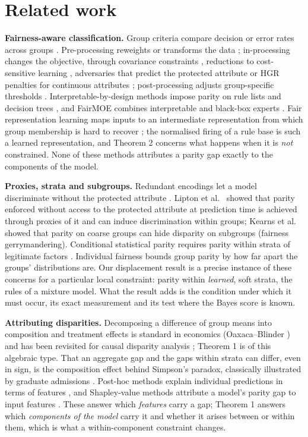 \hypertarget{related-work}{%
\section{Related work}\label{related-work}}

\textbf{Fairness-aware classification.} Group criteria compare decision or error rates across groups \cite{mehrabi,pessach}. Pre-processing reweights or transforms the data \cite{kamiran}; in-processing changes the objective, through covariance constraints \cite{zafar}, reductions to cost-sensitive learning \cite{agarwal}, adversaries that predict the protected attribute \cite{zhang} or HGR penalties for continuous attributes \cite{mary}; post-processing adjusts group-specific thresholds \cite{hardt}. Interpretable-by-design methods impose parity on rule lists \cite{aivodji} and decision trees \cite{barata}, and FairMOE combines interpretable and black-box experts \cite{fairmoe}. Fair representation learning maps inputs to an intermediate representation from which group membership is hard to recover \cite{zemel}; the normalised firing of a rule base is such a learned representation, and Theorem 2 concerns what happens when it is \emph{not} constrained. None of these methods attributes a parity gap exactly to the components of the model.

\textbf{Proxies, strata and subgroups.} Redundant encodings let a model discriminate without the protected attribute \cite{pedreschi}. Lipton et al.~\cite{lipton} showed that parity enforced without access to the protected attribute at prediction time is achieved through proxies of it and can induce discrimination within groups; Kearns et al.~\cite{kearns} showed that parity on coarse groups can hide disparity on subgroups (fairness gerrymandering). Conditional statistical parity requires parity within strata of legitimate factors \cite{kamiran2013,corbett}. Individual fairness \cite{dwork} bounds group parity by how far apart the groups' distributions are. Our displacement result is a precise instance of these concerns for a particular local constraint: parity within \emph{learned}, soft strata, the rules of a mixture model. What the result adds is the condition under which it must occur, its exact measurement and its test where the Bayes score is known.

\textbf{Attributing disparities.} Decomposing a difference of group means into composition and treatment effects is standard in economics (Oaxaca--Blinder \cite{oaxaca,blinder}) and has been revisited for causal disparity analysis \cite{opacic}; Theorem 1 is of this algebraic type. That an aggregate gap and the gaps within strata can differ, even in sign, is the composition effect behind Simpson's paradox, classically illustrated by graduate admissions \cite{bickel}. Post-hoc methods explain individual predictions in terms of features \cite{lime,shap,guidotti}, and Shapley-value methods attribute a model's parity gap to input features \cite{begley}. These answer which \emph{features} carry a gap; Theorem 1 answers which \emph{components of the model} carry it and whether it arises between or within them, which is what a within-component constraint changes.

